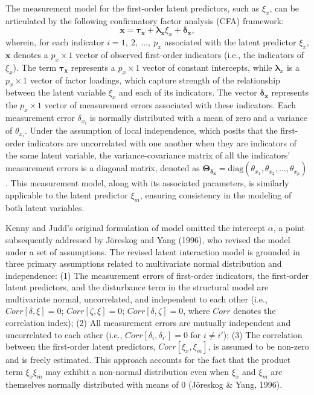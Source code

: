 \documentclass[
  man,mask]{apa6}
\begin{document}
The measurement model for the first-order latent predictors, such as \(\xi_{x}\), can be articulated by the following confirmatory factor analysis (CFA) framework:
\begin{equation}
\mathbf{x} = \boldsymbol{\tau_{x}} + \boldsymbol{\lambda_{x}}\xi_{x} + \boldsymbol{\delta_{x}},
\end{equation}
wherein, for each indicator \(i = 1, \ 2, \ ..., \ p_{x}\) associated with the latent predictor \(\xi_{x}\), \(\mathbf{x}\) denotes a \(p_{x} \times 1\) vector of observed first-order indicators (i.e., the indicators of \(\xi_{x}\)). The term \(\boldsymbol{\tau_{x}}\) represents a \(p_{x} \times 1\) vector of constant intercepts, while \(\boldsymbol{\lambda}_{x}\) is a \(p_{x} \times 1\) vector of factor loadings, which capture strength of the relationship between the latent variable \(\xi_{x}\) and each of its indicators. The vector \(\boldsymbol{\delta_{x}}\) represents the \(p_{x} \times 1\) vector of measurement errors associated with these indicators. Each measurement error \(\delta_{x_{i}}\) is normally distributed with a mean of zero and a variance of \(\theta_{x_{i}}\). Under the assumption of local independence, which posits that the first-order indicators are uncorrelated with one another when they are indicators of the same latent variable, the variance-covariance matrix of all the indicators' measurement errors is a diagonal matrix, denoted as \(\mathbf{\Theta_{\delta_{x}}} = \text{diag}(\theta_{x_{1}}, \theta_{x_{2}}, ..., \theta_{x_{p}})\). This measurement model, along with its associated parameters, is similarly applicable to the latent predictor \(\xi_{m}\), ensuring consistency in the modeling of both latent variables.

Kenny and Judd's original formulation of model omitted the intercept \(\alpha\), a point subsequently addressed by Jöreskog and Yang (1996), who revised the model under a set of assumptions. The revised latent interaction model is grounded in three primary assumptions related to multivariate normal distribution and independence: (1) The measurement errors of first-order indicators, the first-order latent predictors, and the disturbance term in the structural model are multivariate normal, uncorrelated, and independent to each other (i.e., \(Corr[\delta, \xi] = 0\); \(Corr[\zeta, \xi] = 0\); \(Corr[\delta, \zeta] = 0\), where \(Corr\) denotes the correlation index); (2) All measurement errors are mutually independent and uncorrelated to each other (i.e., \(Corr[\delta_{i}, \delta_{i'}] = 0\) for \(i \neq i'\)); (3) The correlation between the first-order latent predictors, \(Corr[\xi_{x}, \xi_{m}]\), is assumed to be non-zero and is freely estimated. This approach accounts for the fact that the product term \(\xi_{x}\xi_{m}\) may exhibit a non-normal distribution even when \(\xi_{x}\) and \(\xi_{m}\) are themselves normally distributed with means of 0 (Jöreskog \& Yang, 1996).
\end{document}
